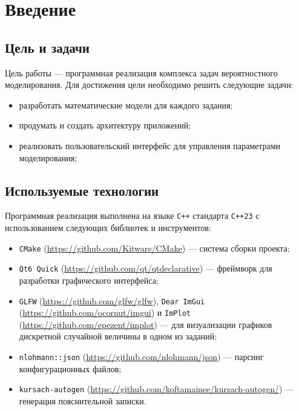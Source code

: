 \documentclass[14pt,a4paper]{extarticle}
\begin{document}
\section*{Введение}

\subsection{Цель и задачи}

Цель работы — программная реализация комплекса задач вероятностного моделирования. Для достижения цели необходимо решить следующие задачи:


\begin{itemize}
  \item разработать математические модели для каждого задания;
  \item продумать и создать архитектуру приложений;
  \item реализовать пользовательский интерфейс для управления параметрами моделирования;
\end{itemize}

\subsection{Используемые технологии}

Программная реализация выполнена на языке \texttt{C++} стандарта \texttt{C++23} с использованием следующих библиотек и инструментов:


\begin{itemize}
  \item \texttt{CMake} (\url{https://github.com/Kitware/CMake}) — система сборки проекта;
  \item \texttt{Qt6 Quick} (\url{https://github.com/qt/qtdeclarative}) — фреймворк для разработки графического интерфейса;
  \item \texttt{GLFW} (\url{https://github.com/glfw/glfw}), \texttt{Dear ImGui} (\url{https://github.com/ocornut/imgui}) и \texttt{ImPlot} (\url{https://github.com/epezent/implot}) — для визуализации графиков дискретной случайной величины в одном из заданий;
  \item \texttt{nlohmann::json} (\url{https://github.com/nlohmann/json}) — парсинг конфигурационных файлов;
  \item \texttt{kursach-autogen} (\url{https://github.com/koftamainee/kursach-autogen/}) — генерация пояснительной записки.
\end{itemize}
\end{document}
